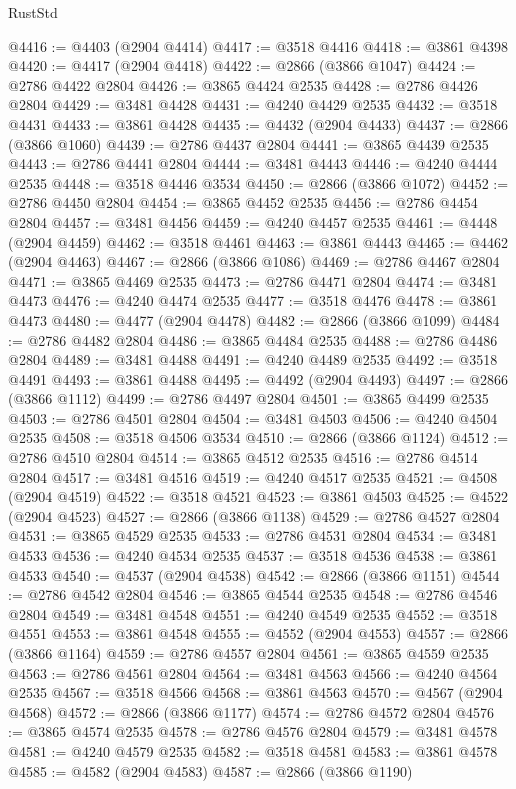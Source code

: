 \begin{lexlean}{RustStd}
\begin{coremodule}
@4416 := @4403 (@2904 @4414)
@4417 := @3518 @4416
@4418 := @3861 @4398
@4420 := @4417 (@2904 @4418)
@4422 := @2866 (@3866 @1047)
@4424 := @2786 @4422 @2804
@4426 := @3865 @4424 @2535
@4428 := @2786 @4426 @2804
@4429 := @3481 @4428
@4431 := @4240 @4429 @2535
@4432 := @3518 @4431
@4433 := @3861 @4428
@4435 := @4432 (@2904 @4433)
@4437 := @2866 (@3866 @1060)
@4439 := @2786 @4437 @2804
@4441 := @3865 @4439 @2535
@4443 := @2786 @4441 @2804
@4444 := @3481 @4443
@4446 := @4240 @4444 @2535
@4448 := @3518 @4446 @3534
@4450 := @2866 (@3866 @1072)
@4452 := @2786 @4450 @2804
@4454 := @3865 @4452 @2535
@4456 := @2786 @4454 @2804
@4457 := @3481 @4456
@4459 := @4240 @4457 @2535
@4461 := @4448 (@2904 @4459)
@4462 := @3518 @4461
@4463 := @3861 @4443
@4465 := @4462 (@2904 @4463)
@4467 := @2866 (@3866 @1086)
@4469 := @2786 @4467 @2804
@4471 := @3865 @4469 @2535
@4473 := @2786 @4471 @2804
@4474 := @3481 @4473
@4476 := @4240 @4474 @2535
@4477 := @3518 @4476
@4478 := @3861 @4473
@4480 := @4477 (@2904 @4478)
@4482 := @2866 (@3866 @1099)
@4484 := @2786 @4482 @2804
@4486 := @3865 @4484 @2535
@4488 := @2786 @4486 @2804
@4489 := @3481 @4488
@4491 := @4240 @4489 @2535
@4492 := @3518 @4491
@4493 := @3861 @4488
@4495 := @4492 (@2904 @4493)
@4497 := @2866 (@3866 @1112)
@4499 := @2786 @4497 @2804
@4501 := @3865 @4499 @2535
@4503 := @2786 @4501 @2804
@4504 := @3481 @4503
@4506 := @4240 @4504 @2535
@4508 := @3518 @4506 @3534
@4510 := @2866 (@3866 @1124)
@4512 := @2786 @4510 @2804
@4514 := @3865 @4512 @2535
@4516 := @2786 @4514 @2804
@4517 := @3481 @4516
@4519 := @4240 @4517 @2535
@4521 := @4508 (@2904 @4519)
@4522 := @3518 @4521
@4523 := @3861 @4503
@4525 := @4522 (@2904 @4523)
@4527 := @2866 (@3866 @1138)
@4529 := @2786 @4527 @2804
@4531 := @3865 @4529 @2535
@4533 := @2786 @4531 @2804
@4534 := @3481 @4533
@4536 := @4240 @4534 @2535
@4537 := @3518 @4536
@4538 := @3861 @4533
@4540 := @4537 (@2904 @4538)
@4542 := @2866 (@3866 @1151)
@4544 := @2786 @4542 @2804
@4546 := @3865 @4544 @2535
@4548 := @2786 @4546 @2804
@4549 := @3481 @4548
@4551 := @4240 @4549 @2535
@4552 := @3518 @4551
@4553 := @3861 @4548
@4555 := @4552 (@2904 @4553)
@4557 := @2866 (@3866 @1164)
@4559 := @2786 @4557 @2804
@4561 := @3865 @4559 @2535
@4563 := @2786 @4561 @2804
@4564 := @3481 @4563
@4566 := @4240 @4564 @2535
@4567 := @3518 @4566
@4568 := @3861 @4563
@4570 := @4567 (@2904 @4568)
@4572 := @2866 (@3866 @1177)
@4574 := @2786 @4572 @2804
@4576 := @3865 @4574 @2535
@4578 := @2786 @4576 @2804
@4579 := @3481 @4578
@4581 := @4240 @4579 @2535
@4582 := @3518 @4581
@4583 := @3861 @4578
@4585 := @4582 (@2904 @4583)
@4587 := @2866 (@3866 @1190)

\end{coremodule}
\end{lexlean}
